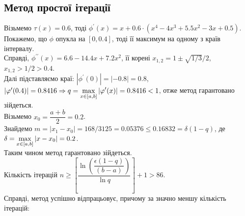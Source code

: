\subsection{Метод простої ітерації}
Візьмемо $\tau(x) = 0.6$, тоді $\phi^\prime(x) = x + 0.6 \cdot (x^4 - 4 x^3 + 5.5 x^2 - 3x + 0.5)$. \\

Покажемо, що $\phi$ опукла на $[0, 0.4]$, тоді її максимум на одному з країв інтервалу. \\

Справді, $\phi^{\prime\prime}(x) = 6.6 - 14.4 x + 7.2 x^2$, її корені $x_{1,2} = 1 \pm \sqrt{1/3} / 2$, $x_{1, 2} > 1 / 2 > 0.4$. \\

Далі підставляємо краї: $|\phi^\prime(0)| = |-0.8| = 0.8$, $|\varphi^\prime(0.4)| = 0.8416 \Rightarrow q = \displaystyle\max\limits_{x\in[a,b]} |\varphi^\prime(x)| = 0.8416 < 1$, отже метод гарантовано зійдеться. \\

Візьмемо $x_0 = \dfrac{a + b}{2} = 0.2$. \\

Знайдемо $m = |x_1 - x_0| = 168/3125 = 0.05376 \le 0.16832 = \delta (1 - q)$, де $\delta = \displaystyle\max\limits_{x\in[a,b]}|x - x_0| = 0.2$. \\

Таким чином метод гарантовано зійдеться. \\

Кількість ітерацій $n \ge \left[ \dfrac{\ln \left(\dfrac{\epsilon(1-q)}{(b-a)}\right)}{\ln q} \right] + 1 > 86$. \\

Справді, метод успішно відпрацьовує, причому за значно меншу кількість ітерацій:
    
